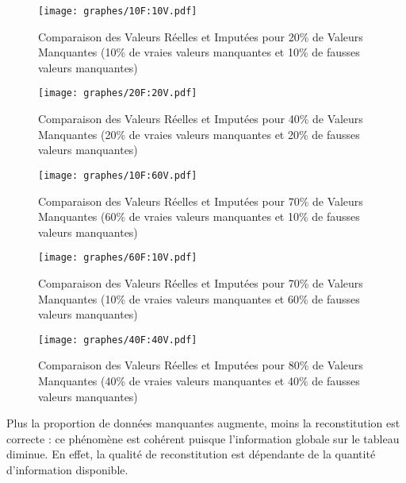 \documentclass[12pt, openany, fleqn, french]{article}
\begin{document}
\begin{center}
\begin{figure}[H]
\centering
  \texttt{[image: graphes/10F:10V.pdf]}
  \caption{Comparaison des Valeurs Réelles et Imputées pour 20\% de Valeurs Manquantes (10\% de vraies valeurs manquantes et 10\% de fausses valeurs manquantes)}
\end{figure}
\end{center}

\begin{center}
\begin{figure}[H]
\centering
  \texttt{[image: graphes/20F:20V.pdf]}
  \caption{Comparaison des Valeurs Réelles et Imputées pour 40\% de Valeurs Manquantes (20\% de vraies valeurs manquantes et 20\% de fausses valeurs manquantes)}
\end{figure}
\end{center}

\begin{center}
\begin{figure}[H]
\centering
  \texttt{[image: graphes/10F:60V.pdf]}
  \caption{Comparaison des Valeurs Réelles et Imputées pour 70\% de Valeurs Manquantes (60\% de vraies valeurs manquantes et 10\% de fausses valeurs manquantes)}
\end{figure}
\end{center}

\begin{center}
\begin{figure}[H]
\centering
  \texttt{[image: graphes/60F:10V.pdf]}
  \caption{Comparaison des Valeurs Réelles et Imputées pour 70\% de Valeurs Manquantes (10\% de vraies valeurs manquantes et 60\% de fausses valeurs manquantes)}
\end{figure}
\end{center}

\begin{center}
\begin{figure}[H]
\centering
  \texttt{[image: graphes/40F:40V.pdf]}
  \caption{Comparaison des Valeurs Réelles et Imputées pour 80\% de Valeurs Manquantes (40\% de vraies valeurs manquantes et 40\% de fausses valeurs manquantes)}
\end{figure}
\end{center}


Plus la proportion de données manquantes augmente, moins la reconstitution est correcte : ce phénomène est cohérent puisque l'information globale sur le tableau diminue. En effet, la qualité de reconstitution est dépendante de la quantité d'information disponible.
\end{document}
